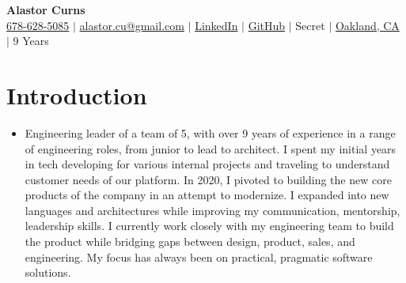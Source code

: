 \documentclass[letterpaper,11pt]{article}
\newcommand{\resumeSubHeadingListStart}{\begin{itemize}[leftmargin=0.08in, label={}]}
\newcommand{\resumeSubHeadingListEnd}{\end{itemize}}
\begin{document}
\begin{center}
  \textbf{\Huge Alastor Curns} \\ \vspace{2pt}
  \faMobile \hspace{.5pt} \href{tel:16786285085}{678-628-5085}
  $|$
  \href{mailto:alastor.cu@gmail.com}{alastor.cu@gmail.com}
  $|$
  \faLinkedinSquare \hspace{.5pt} \href{https://www.linkedin.com/in/alastorc}{LinkedIn}
  $|$
  \faGithub \hspace{.5pt} \href{https://github.com/alastor-lee}{GitHub}
  $|$
  \faShield \hspace{.5pt} Secret
  $|$
  \faGlobe \hspace{.5pt} \href{https://maps.app.goo.gl/CdQMUuxD24zfLjYq7}{Oakland, CA}
  $|$
  \faHistory \hspace{.5pt} 9 Years
\end{center}

\section{Introduction}
\resumeSubHeadingListStart
\item{
            Engineering leader of a team of 5, with over 9 years of experience in a range of engineering roles, from junior to lead to architect.
            I spent my initial years in tech developing for various internal projects and traveling to understand customer needs of our platform.
            In 2020, I pivoted to building the new core products of the company in an attempt to modernize. 
            I expanded into new languages and architectures while improving my communication, mentorship, leadership skills.
            I currently work closely with my engineering team to build the product while bridging gaps between design, product, sales, and engineering.
            My focus has always been on practical, pragmatic software solutions.
      }
\resumeSubHeadingListEnd
\end{document}
